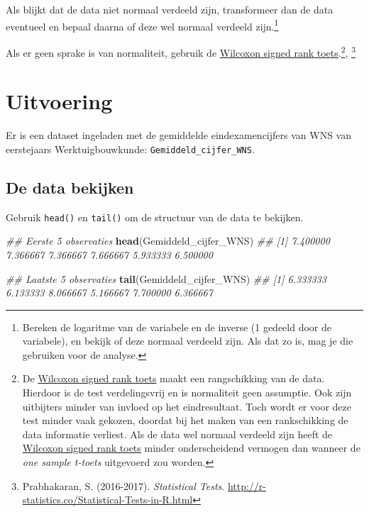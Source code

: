\documentclass[
]{article}
\newenvironment{Shaded}{\begin{snugshade}}{\end{snugshade}}
\newcommand{\CommentTok}[1]{\textcolor[rgb]{0.56,0.35,0.01}{\textit{#1}}}
\newcommand{\KeywordTok}[1]{\textcolor[rgb]{0.13,0.29,0.53}{\textbf{#1}}}
\newcommand{\NormalTok}[1]{#1}
\begin{document}
Als blijkt dat de data niet normaal verdeeld zijn, transformeer dan de
data eventueel en bepaal daarna of deze wel normaal verdeeld
zijn.\footnote{Bereken de logaritme van de variabele en de inverse (1
  gedeeld door de variabele), en bekijk of deze normaal verdeeld zijn.
  Als dat zo is, mag je die gebruiken voor de analyse.}

Als er geen sprake is van normaliteit, gebruik de
\href{07-Wilcoxon-signed-rank-toets-R.html}{Wilcoxon signed rank
toets}.\footnote{De \href{07-Wilcoxon-signed-rank-toets-R.html}{Wilcoxon
  signed rank toets} maakt een rangschikking van de data. Hierdoor is de
  test verdelingsvrij en is normaliteit geen assumptie. Ook zijn
  uitbijters minder van invloed op het eindresultaat. Toch wordt er voor
  deze test minder vaak gekozen, doordat bij het maken van een
  rankschikking de data informatie verliest. Als de data wel normaal
  verdeeld zijn heeft de
  \href{07-Wilcoxon-signed-rank-toets-R.html}{Wilcoxon signed rank
  toets} minder onderscheidend vermogen dan wanneer de \emph{one sample
  t-toets} uitgevoerd zou worden.}, \footnote{Prabhakaran, S.
  (2016-2017). \emph{Statistical Tests}.
  \url{http://r-statistics.co/Statistical-Tests-in-R.html}}

\hypertarget{uitvoering}{%
\section{Uitvoering}\label{uitvoering}}

Er is een dataset ingeladen met de gemiddelde eindexamencijfers van WNS
van eerstejaars Werktuigbouwkunde: \texttt{Gemiddeld\_cijfer\_WNS}.

\hypertarget{de-data-bekijken}{%
\subsection{De data bekijken}\label{de-data-bekijken}}

Gebruik \texttt{head()} en \texttt{tail()} om de structuur van de data
te bekijken.

\begin{Shaded}
\begin{Highlighting}[]
\CommentTok{## Eerste 5 observaties}
\KeywordTok{head}\NormalTok{(Gemiddeld_cijfer_WNS)}
\CommentTok{## [1] 7.400000 7.366667 7.366667 7.666667 5.933333 6.500000}

\CommentTok{## Laatste 5 observaties}
\KeywordTok{tail}\NormalTok{(Gemiddeld_cijfer_WNS)}
\CommentTok{## [1] 6.333333 6.133333 8.066667 5.166667 7.700000 6.366667}
\end{Highlighting}
\end{Shaded}
\end{document}
